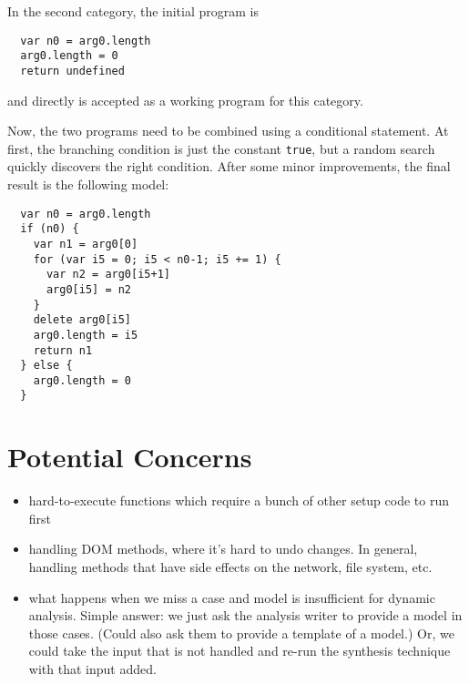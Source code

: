 \documentclass[]{article}
\newcommand{\code}[1]{\lstinline{#1}}
\begin{document}
In the second category, the initial program is
\begin{verbatim}
  var n0 = arg0.length
  arg0.length = 0
  return undefined
\end{verbatim}
and directly is accepted as a working program for this category.

Now, the two programs need to be combined using a conditional statement.
At first, the branching condition is just the constant \code{true},
but a random search quickly discovers the right condition.
After some minor improvements, the final result is the following model:
\begin{verbatim}
  var n0 = arg0.length
  if (n0) {
    var n1 = arg0[0]
    for (var i5 = 0; i5 < n0-1; i5 += 1) {
      var n2 = arg0[i5+1]
      arg0[i5] = n2
    }
    delete arg0[i5]
    arg0.length = i5
    return n1
  } else {
    arg0.length = 0
  }
\end{verbatim}


\section*{Potential Concerns}

\begin{itemize}
  \item hard-to-execute functions which require a bunch of other setup code to
  run first
  \item handling DOM methods, where it's hard to undo changes.  In general,
  handling methods that have side effects on the network, file system, etc.
  \item what happens when we miss a case and model is insufficient for dynamic
  analysis.  Simple answer: we just ask the analysis writer to provide a model in
  those cases.  (Could also ask them to provide a template of a model.)  Or, we
  could take the input that is not handled and re-run the synthesis technique with
  that input added.
\end{itemize}











% 
% 
\end{document}
